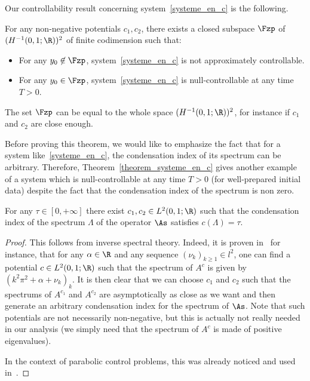 Our controllability result concerning system~\eqref{systeme_en_c} is the following.
\begin{theo}\label{theorem_systeme_en_c}
For any non-negative potentials $c_1,c_2$, there exists a closed subspace $\Fzp$ of $(H^{-1}(0,1 ; \R))^2$ of finite codimension such that:
\begin{itemize}
\item For any $y_0\not\in \Fzp$, system~\eqref{systeme_en_c} is not approximately controllable.
\item For any $y_0\in \Fzp$, system~\eqref{systeme_en_c} is null-controllable at any time $T>0$.
\end{itemize}
\end{theo}

\begin{rema}
The set $\Fzp$ can be equal to the whole space $(H^{-1}(0,1 ; \R))^2$, for instance if $c_1$ and $c_2$ are close enough.
\end{rema}

Before proving this theorem, we would like to emphasize the fact that for a system like~\eqref{systeme_en_c}, the condensation index of its spectrum can be arbitrary. Therefore, Theorem~\ref{theorem_systeme_en_c} gives another example of a system which is null-controllable at any time $T>0$ (for well-prepared initial data) despite the fact that the condensation index of the spectrum is non zero.

\begin{prop}
For any $\tau\in [0,+\infty]$ there exist $c_1,c_2\in L^2(0,1;\R)$ such that the condensation index of the spectrum $\Lambda$ of the operator $\As$ satisfies $c(\Lambda)=\tau$.
\end{prop}

\begin{proof}
This follows from inverse spectral theory. Indeed, it is proven in~\cite[Chapter~3]{PoeschelTrubowitz:1987} for instance, that for any $\alpha\in \R$ and any sequence $(\nu_k)_{k\geq 1}\in l^2$, one can find a potential $c\in L^2(0,1;\R)$ such that the spectrum of $A^c$ is given by $(k^2\pi^2 + \alpha + \nu_k)_k$. It is then clear that we can choose $c_1$ and $c_2$ such that the spectrums of $A^{c_1}$ and $A^{c_2}$ are asymptotically as close as we want and then generate an arbitrary condensation index for the spectrum of $\As$. Note that such potentials are not necessarily non-negative, but this is actually not really needed in our analysis (we simply need that the spectrum of $A^c$ is made of positive eigenvalues).

In the context of parabolic control problems, this was already noticed and used in~\cite{Ouaili18}.
\end{proof}

